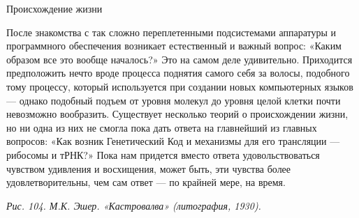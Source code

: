 Происхождение жизни

После знакомства с так сложно переплетенными подсистемами аппаратуры и программного обеспечения возникает естественный и важный вопрос: «Каким образом все это вообще началось?» Это на самом деле удивительно. Приходится предположить нечто вроде процесса поднятия самого себя за волосы, подобного тому процессу, который используется при создании новых компьютерных языков --- однако подобный подъем от уровня молекул до уровня целой клетки почти невозможно вообразить. Существует несколько теорий о происхождении жизни, но ни одна из них не смогла пока дать ответа на главнейший из главных вопросов: «Как возник Генетический Код и механизмы для его трансляции --- рибосомы и тРНК?» Пока нам придется вместо ответа удовольствоваться чувством удивления и восхищения, может быть, эти чувства более удовлетворительны, чем сам ответ --- по крайней мере, на время.

\emph{Рис. 104. М.К. Эшер. «Кастровалва» (литография, 1930).}

